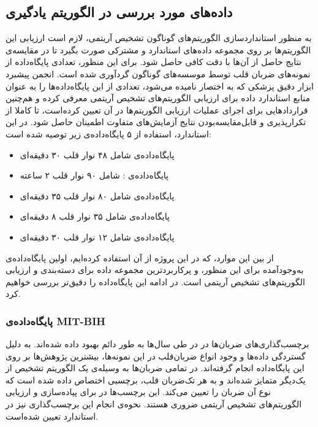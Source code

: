 	\subsection{داده‌های مورد بررسی در الگوریتم یادگیری}
	به منظور استانداردسازی الگوریتم‌های گوناگون تشخیص آریتمی، لازم است ارزیابی این الگوریتم‌ها بر روی مجموعه داده‌های استاندارد و مشترکی صورت بگیرد تا در مقایسه‌ی نتایج حاصل از آن‌ها با دقت کافی حاصل شود. برای این منظور، تعدادی پایگاه‌داده از نمونه‌های ضربان قلب توسط موسسه‌های گوناگون گردآوری شده است. انجمن پیشبرد ابزار دقیق پزشکی که به اختصار  نامیده می‌شود، تعدادی از این پایگاه‌داده‌ها را به عنوان منابع استاندارد داده برای ارزیابی الگوریتم‌های تشخیص آریتمی معرفی کرده و هم‌چنین قراردادهایی برای اجرای عملیات ارزیابی الگوریتم‌ها در آن تعیین کرده‌است، تا کاملا از تکرارپذیری و قابل‌مقایسه‌بودن نتایج آزمایش‌های متفاوت اطمینان حاصل شود. در این استاندارد، استفاده از ۵ پایگاه‌داده‌ی زیر توصیه شده است:
\begin{itemize}
	\item پایگاه‌داده‌ی  شامل ۴۸ نوار قلب ۳۰ دقیقه‌ای
	\item پایگاه‌داده‌ی : شامل ۹۰ نوار قلب ۲ ساعته
	\item پایگاه‌داده‌ی  شامل ۸۰ نوار قلب ۳۵ دقیقه‌ای
	\item پایگاه‌داده‌ی  شامل ۳۵ نوار قلب ۸ دقیقه‌ای
	\item پایگاه‌داده‌ی  شامل ۱۲ نوار قلب ۳۰ دقیقه‌ای
\end{itemize}	 
از بین این موارد،  که در این پروژه از آن استفاده کرده‌ایم، اولین پایگاه‌داده‌ی به‌وجودآمده برای این منظور، و پرکاربردترین مجموعه داده برای دسته‌بندی و ارزیابی الگوریتم‌های تشخیص آریتمی است.\cite{ECGSurvey} در ادامه این پایگاه‌داده را دقیق‌تر بررسی خواهیم کرد. 


		\subsubsection{پایگاه‌داده‌ی MIT-BIH}
		برچسب‌گذاری‌های ضربان‌ها در  در طی سال‌ها به طور دائم بهبود داده شده‌اند. به دلیل گستردگی داده‌ها و وجود انواع ضربان‌قلب در این نمونه‌‌ها، بیشترین پژوهش‌ها بر روی این پایگاه‌داده‌ انجام گرفته‌اند.\cite{ECGSurvey} 
در  تمامی ضربان‌ها به وسیله‌ی یک الگوریتم تشخیص  از یک‌دیگر متمایز شده‌اند و به هر تک‌ضربان قلب، برچسبی اختصاص داده شده است که نوع آن ضربان  را تعیین می‌کند. این برچسب‌ها در برای پیاده‌سازی و ارزیابی الگوریتم‌های تشخیص آریتمی ضروری هستند. نحوه‌ی انجام این برچسب‌گذاری نیز در استاندارد  تعیین شده‌است.

